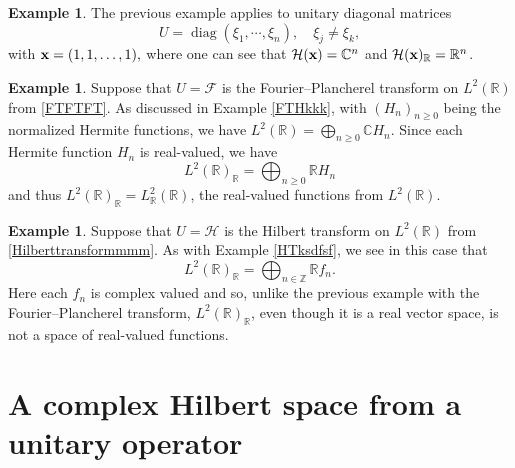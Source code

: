 \documentclass{dis}
\theoremstyle{plain}
\theoremstyle{definition}
\newtheorem{Example}[equation]{Example}
\def\C{\mathbb{C}}
\def\R{\mathbb{R}}
\def\Z{\mathbb{Z}}
\renewcommand{\geq}{\geqslant}
\renewcommand{\vec}[1]{{\bf #1}}
\newcommand{\0}{{\color{lightgray}0}}
\begin{document}
\begin{Example}\label{exxarrrrrnnnn}
The previous example applies to unitary diagonal matrices $$U = \operatorname{diag}(\xi_1, \cdots, \xi_n), \quad   \xi_j \not = \xi_k,$$ with $\vec{x} = (1, 1, \ldots, 1),$ where one can see that $\mathcal{H}(\vec{x}) = \C^{n}$ and  $\mathcal{H}(\vec{x})_{\R} = \R^n$.
\end{Example}


\begin{Example}\label{FT666554}
Suppose that $U = \mathcal{F}$ is the Fourier--Plancherel transform on $L^2(\R)$ from \eqref{FTFTFT}. As discussed in Example \ref{FTHkkk}, with $(H_n)_{n \geq 0}$ being the normalized Hermite functions, we have $L^2(\R) = \bigoplus_{n \geq 0} \C H_n$. Since each Hermite function $H_n$ is real-valued, we have $$L^2(\R)_{\R} = \bigoplus_{n \geq 0} \R H_n$$ and thus $L^2(\R)_{\R} = L^{2}_{\R}(\R)$, the real-valued functions from $L^2(\R)$.
\end{Example}

\begin{Example}\label{HT00sdfspPPIPI}
Suppose that $U = \mathscr{H}$ is the Hilbert transform on $L^2(\R)$ from \eqref{Hilberttransformmmm}. As with Example \ref{HTksdfsf}, we see in this case that 
$$L^{2}(\R)_{\R} = \bigoplus_{n\in \Z} \R f_n.$$ Here each $f_n$ is complex valued and so, unlike the previous example with the Fourier--Plancherel transform, $L^2(\R)_{\R}$, even though it is a real vector space,  is not a space of real-valued functions.
\end{Example}


\section{A complex Hilbert space from a unitary operator}
\end{document}
